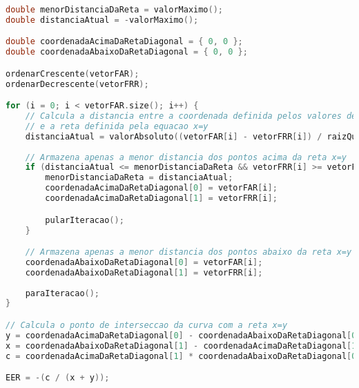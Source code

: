 \begin{lstlisting}[language=C++, caption={Algoritmo para o cálculo do EER}, label={lst:EERAlgo}]
double menorDistanciaDaReta = valorMaximo();
double distanciaAtual = -valorMaximo();

double coordenadaAcimaDaRetaDiagonal = { 0, 0 };
double coordenadaAbaixoDaRetaDiagonal = { 0, 0 };

ordenarCrescente(vetorFAR);
ordenarDecrescente(vetorFRR);

for (i = 0; i < vetorFAR.size(); i++) {
	// Calcula a distancia entre a coordenada definida pelos valores de FAR e FRR
	// e a reta definida pela equacao x=y
	distanciaAtual = valorAbsoluto((vetorFAR[i] - vetorFRR[i]) / raizQuadrada(2));
	
	// Armazena apenas a menor distancia dos pontos acima da reta x=y
	if (distanciaAtual <= menorDistanciaDaReta && vetorFRR[i] >= vetorFAR[i]) {
		menorDistanciaDaReta = distanciaAtual;
		coordenadaAcimaDaRetaDiagonal[0] = vetorFAR[i];
		coordenadaAcimaDaRetaDiagonal[1] = vetorFRR[i];

		pularIteracao();
	}

	// Armazena apenas a menor distancia dos pontos abaixo da reta x=y
	coordenadaAbaixoDaRetaDiagonal[0] = vetorFAR[i];
	coordenadaAbaixoDaRetaDiagonal[1] = vetorFRR[i];
	
	paraIteracao();
}

// Calcula o ponto de interseccao da curva com a reta x=y
y = coordenadaAcimaDaRetaDiagonal[0] - coordenadaAbaixoDaRetaDiagonal[0] - 1;
x = coordenadaAbaixoDaRetaDiagonal[1] - coordenadaAcimaDaRetaDiagonal[1] + 1;
c = coordenadaAcimaDaRetaDiagonal[1] * coordenadaAbaixoDaRetaDiagonal[0] - coordenadaAcimaDaRetaDiagonal[0] * coordenadaAbaixoDaRetaDiagonal[1];

EER = -(c / (x + y));
\end{lstlisting}